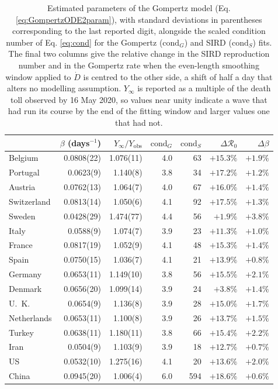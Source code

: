 \documentclass{article}
\begin{document}
\begin{table}
\centering
\caption{Estimated parameters of the Gompertz model
(Eq. \ref{eq:GompertzODE2param}), with standard deviations in parentheses corresponding
to the last reported digit, alongside the scaled condition number of
Eq. \ref{eq:cond} for the Gompertz ($\mathrm{cond}_G$) and SIRD ($\mathrm{cond}_S$)
fits. The final two columns give the relative change in the SIRD reproduction number and
in the Gompertz rate when the even-length smoothing window applied to $\dot{D}$ is
centred to the other side, a shift of half a day that alters no modelling assumption.
$Y_{\infty}$ is reported as a multiple of the death toll observed by 16 May 2020, so
values near unity indicate a wave that had run its course by the end of the fitting
window and larger values one that had not.}
\label{tab:sird}
\label{tab:stability}
\begin{tabular}{lrrrrrr}
\toprule
{} & $\beta$ (days$^{-1}$) & $Y_{\infty}/Y_{\mathrm{obs}}$ & $\mathrm{cond}_G$ & $\mathrm{cond}_S$ & $\Delta\mathcal{R}_0$ & $\Delta\beta$ \\
\midrule
Belgium          & 0.0808(22) & 1.076(11) & 4.0 & 63 & $+15.3\%$ & $+1.9\%$ \\
Portugal         & 0.0623(9) & 1.140(8) & 3.8 & 34 & $+17.2\%$ & $+1.2\%$ \\
Austria          & 0.0762(13) & 1.064(7) & 4.0 & 67 & $+16.0\%$ & $+1.4\%$ \\
Switzerland      & 0.0813(14) & 1.050(6) & 4.1 & 92 & $+17.5\%$ & $+1.3\%$ \\
Sweden           & 0.0428(29) & 1.474(77) & 4.4 & 56 & $+1.9\%$ & $+3.8\%$ \\
Italy            & 0.0588(9) & 1.074(7) & 3.9 & 23 & $+11.3\%$ & $+1.0\%$ \\
France           & 0.0817(19) & 1.052(9) & 4.1 & 48 & $+15.3\%$ & $+1.4\%$ \\
Spain            & 0.0750(15) & 1.036(7) & 4.1 & 21 & $+13.9\%$ & $+0.8\%$ \\
Germany          & 0.0653(11) & 1.149(10) & 3.8 & 56 & $+15.5\%$ & $+2.1\%$ \\
Denmark          & 0.0656(20) & 1.099(14) & 3.9 & 24 & $+3.8\%$ & $+1.4\%$ \\
U.\ K.           & 0.0654(9) & 1.136(8) & 3.9 & 28 & $+15.0\%$ & $+1.7\%$ \\
Netherlands      & 0.0653(11) & 1.100(8) & 3.9 & 26 & $+13.7\%$ & $+1.5\%$ \\
Turkey           & 0.0638(11) & 1.180(11) & 3.8 & 66 & $+15.4\%$ & $+2.2\%$ \\
Iran             & 0.0504(9) & 1.103(9) & 3.9 & 18 & $+12.7\%$ & $+0.7\%$ \\
US               & 0.0532(10) & 1.275(16) & 4.1 & 20 & $+13.6\%$ & $+2.0\%$ \\
China            & 0.0945(20) & 1.006(4) & 6.0 & 594 & $+18.6\%$ & $+0.6\%$ \\
\bottomrule
\end{tabular}
\end{table}
\end{document}
